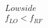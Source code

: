 \documentclass[preview]{standalone}
\begin{document}
\begin{align*}
Low side \\ f_{LO} < f_{RF}
\end{align*}
\end{document}
